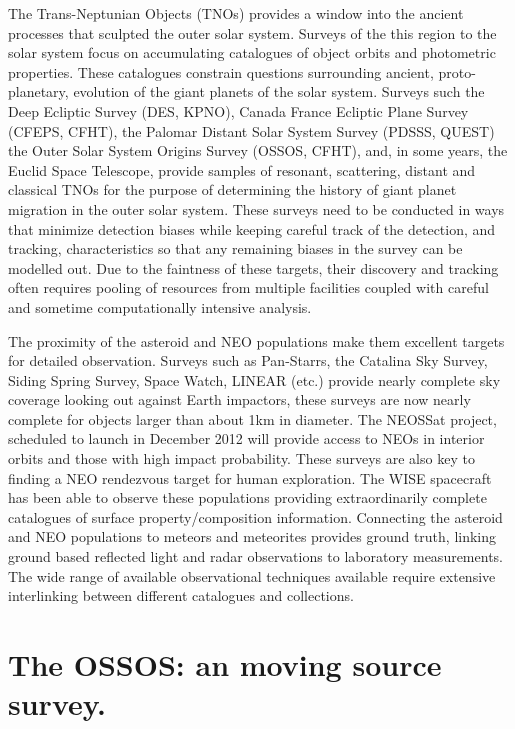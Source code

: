 The Trans-Neptunian Objects (TNOs) provides a window into the ancient processes that sculpted the outer solar system.  
Surveys of the this region to the solar system focus on accumulating catalogues of object orbits and photometric properties.  
These catalogues constrain questions surrounding ancient, proto-planetary, evolution of the giant planets of the solar system.  
Surveys such the Deep Ecliptic Survey (DES, KPNO),  Canada France Ecliptic Plane Survey (CFEPS, CFHT), the Palomar Distant Solar System Survey (PDSSS, QUEST)  the  Outer Solar System Origins Survey (OSSOS, CFHT),  and, in some years, the Euclid Space Telescope, provide samples of resonant, scattering, distant and classical TNOs for the purpose of determining the history of giant planet migration in the outer solar system.
These surveys need to be conducted in ways that minimize detection biases while keeping careful track of the detection, and tracking, characteristics so that any remaining biases in the survey can be modelled out. 
Due to the faintness of these targets, their discovery and tracking often requires pooling of resources from multiple facilities coupled with careful and sometime computationally intensive analysis.

The proximity of the asteroid and NEO populations make them excellent targets for detailed observation.
Surveys such as Pan-Starrs, the Catalina Sky Survey, Siding Spring Survey, Space Watch, LINEAR (etc.) provide nearly complete sky coverage looking out against Earth impactors, these surveys are now nearly complete for objects larger than about 1km in diameter.  
The NEOSSat project, scheduled to launch in December 2012 will provide access to NEOs in interior orbits and those with high impact probability.  
These surveys are also key to finding a NEO rendezvous target for human exploration. 
The WISE spacecraft has been able to observe these populations providing extraordinarily complete catalogues of surface property/composition information. 
Connecting the asteroid and NEO populations to meteors and meteorites provides ground truth, linking ground based reflected light and radar observations to laboratory measurements.
The wide range of available observational techniques available require extensive interlinking between different catalogues and collections.


\section{The OSSOS: an moving source survey.}


